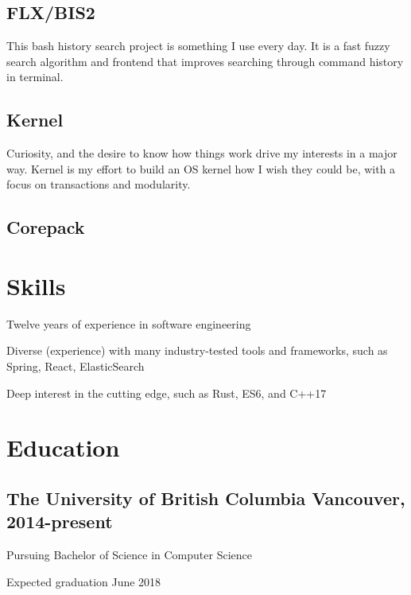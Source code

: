 \documentclass[letterpaper]{article}
\newcommand{\subtitle}{\normalfont\sffamily\color{black}\footnotesize}
\begin{document}
\subsection*{FLX/BIS2}

This bash history search project is something I use every day. It is a fast
fuzzy search algorithm and frontend that improves searching through command
history in terminal.

\subsection*{Kernel}

Curiosity, and the desire to know how things work drive my interests in a major
way. Kernel is my effort to build an OS kernel how I wish they could be, with a
focus on transactions and modularity.

\subsection*{Corepack}


\section*{Skills}

Twelve years of experience in software engineering

Diverse (experience) with many industry-tested tools and frameworks, such as
Spring, React, ElasticSearch

Deep interest in the cutting edge, such as Rust, ES6, and C++17

\section*{Education}

\subsection*{The University of British Columbia \subtitle Vancouver,
  2014-present}

Pursuing Bachelor of Science in Computer Science

Expected graduation June 2018
\end{document}
